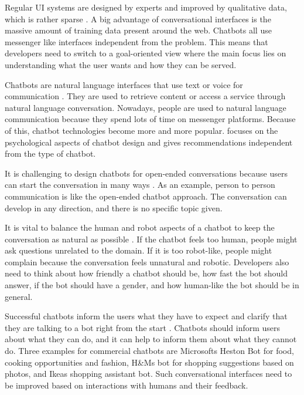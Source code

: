 Regular UI systems are designed by experts and improved by qualitative data, which is rather sparse \cite{folstad2017chatbots}.
A big advantage of conversational interfaces is the massive amount of training data present around the web. 
Chatbots all use messenger like interfaces independent from the problem.
This means that developers need to switch to a goal-oriented view where the main focus lies on understanding what the user wants and how they can be served.

Chatbots are natural language interfaces that use text or voice for communication \cite{brandtzaeg2018chatbots}.
They are used to retrieve content or access a service through natural language conversation.
Nowadays, people are used to natural language communication because they spend lots of time on messenger platforms.
Because of this, chatbot technologies become more and more popular.
\citet{brandtzaeg2018chatbots} focuses on the psychological aspects of chatbot design and gives recommendations independent from the type of chatbot.

It is challenging to design chatbots for open-ended conversations because users can start the conversation in many ways \cite{brandtzaeg2018chatbots}.
As an example, person to person communication is like the open-ended chatbot approach.
The conversation can develop in any direction, and there is no specific topic given.

It is vital to balance the human and robot aspects of a chatbot to keep the conversation as natural as possible \cite{brandtzaeg2018chatbots}.
If the chatbot feels too human, people might ask questions unrelated to the domain.
If it is too robot-like, people might complain because the conversation feels unnatural and robotic.
Developers also need to think about how friendly a chatbot should be, how fast the bot should answer, if the bot should have a gender, and how human-like the bot should be in general.

Successful chatbots inform the users what they have to expect and clarify that they are talking to a bot right from the start \cite{brandtzaeg2018chatbots}.
Chatbots should inform users about what they can do, and it can help to inform them about what they cannot do.
Three examples for commercial chatbots are Microsofts Heston Bot for food, cooking opportunities and fashion, H\&Ms bot for shopping suggestions based on photos, and Ikeas shopping assistant bot.
Such conversational interfaces need to be improved based on interactions with humans and their feedback.



